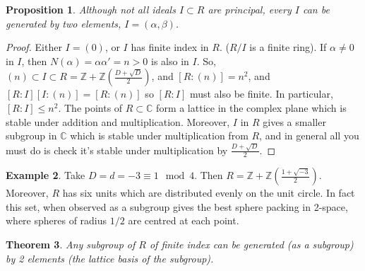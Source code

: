 \documentclass[12pt]{article}
\newtheorem{thm}{Theorem}[section]
\newtheorem{prop}[thm]{Proposition}
\theoremstyle{definition}
\newtheorem{eg}[thm]{Example}
\theoremstyle{remark}
\numberwithin{equation}{section}
\newcommand\C{\mathbb C}    %
\newcommand\Z{\mathbb Z}    %
\begin{document}
\begin{prop}
        Although not all ideals $I \subset R$ are principal, every $I$ can be generated by two elements, $I = (\alpha,\beta)$.
\end{prop}
\begin{proof}
        Either $I = (0)$, or $I$ has finite index in $R$. ($R/I$ is a finite ring). If $\alpha \neq 0$ in $I$, then $N(\alpha) = \alpha\alpha' = n > 0$ is also in $I$. So, $(n) \subset I \subset R = \Z + \Z\left(\frac{D+\sqrt{D}}{2}\right)$, and $[R:(n)] = n^2$, and $[R:I][I:(n)] = [R:(n)]$ so $[R:I]$ must also be finite. In particular, $[R:I] \leq n^2$. The points of $R \subset \C$ form a lattice in the complex plane which is stable under addition and multiplication. Moreover, $I$ in $R$ gives a smaller subgroup in $\C$ which is stable under multiplication from $R$, and in general all you must do is check it's stable under multiplication by $\frac{D+\sqrt{D}}{2}$. 
\end{proof}

\vspace{15pt}

\begin{eg}
        Take $D = d = -3 \equiv 1 \mod 4$. Then $R = \Z + \Z\left(\frac{1+\sqrt{-3}}{2}\right)$. Moreover, $R$ has six units which are distributed evenly on the unit circle. In fact this set, when observed as a subgroup gives the best sphere packing in 2-space, where spheres of radius $1/2$ are centred at each point.
\end{eg}

\vspace{15pt}

\begin{thm}
        Any subgroup of $R$ of finite index can be generated (as a subgroup) by 2 elements (the lattice basis of the subgroup). 
\end{thm}


\vspace{15pt}
\end{document}
